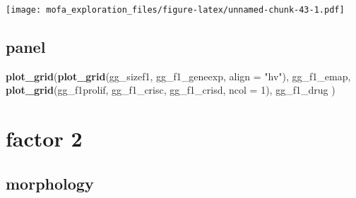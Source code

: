 \documentclass[
]{article}
\newenvironment{Shaded}{\begin{snugshade}}{\end{snugshade}}
\newcommand{\DataTypeTok}[1]{\textcolor[rgb]{0.13,0.29,0.53}{#1}}
\newcommand{\DecValTok}[1]{\textcolor[rgb]{0.00,0.00,0.81}{#1}}
\newcommand{\KeywordTok}[1]{\textcolor[rgb]{0.13,0.29,0.53}{\textbf{#1}}}
\newcommand{\NormalTok}[1]{#1}
\newcommand{\StringTok}[1]{\textcolor[rgb]{0.31,0.60,0.02}{#1}}
\begin{document}
\texttt{[image: mofa\_exploration\_files/figure-latex/unnamed-chunk-43-1.pdf]}

\hypertarget{panel}{%
\subsection{panel}\label{panel}}

\begin{Shaded}
\begin{Highlighting}[]
\KeywordTok{plot_grid}\NormalTok{(}\KeywordTok{plot_grid}\NormalTok{(gg_sizef1, gg_f1_geneexp, }\DataTypeTok{align =} \StringTok{"hv"}\NormalTok{), }
\NormalTok{          gg_f1_emap,}
          \KeywordTok{plot_grid}\NormalTok{(gg_f1prolif, gg_f1_crisc, gg_f1_crisd, }\DataTypeTok{ncol =} \DecValTok{1}\NormalTok{),}
\NormalTok{          gg_f1_drug}
\NormalTok{          )}
\end{Highlighting}
\end{Shaded}

\hypertarget{factor-2}{%
\section{factor 2}\label{factor-2}}

\hypertarget{morphology}{%
\subsection{morphology}\label{morphology}}
\end{document}
